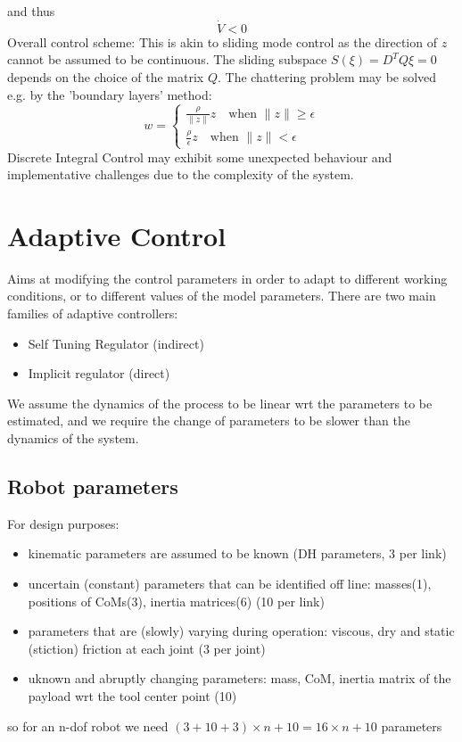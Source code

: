 \documentclass{book}
\begin{document}
and thus
\[
    \dot{V}<0
\]
Overall control scheme:
This is akin to sliding mode control as the direction of $z$ cannot be assumed to be continuous. The sliding subspace $S(\xi)=D^TQ\xi=0$ depends on the choice of the matrix $Q$. The chattering problem may be solved e.g. by the 'boundary layers' method:
\[
    w=\begin{cases}
        \displaystyle\frac{\rho}{\|z\|}z \quad \text{when }\|z\|\geq\epsilon\\
        \displaystyle\frac{\rho}{\epsilon}z \quad \text{when }\|z\|<\epsilon
    \end{cases}
\]
Discrete Integral Control may exhibit some unexpected behaviour and implementative challenges due to the complexity of the system. 


\section{Adaptive Control}
Aims at modifying the control parameters in order to adapt to different working conditions, or to different values of the model parameters.
There are two main families of adaptive controllers:
\begin{itemize}
    \item Self Tuning Regulator (indirect)
    \item Implicit regulator (direct)
\end{itemize}
We assume the dynamics of the process to be linear wrt the parameters to be estimated, and we require the change of parameters to be slower than the dynamics of the system. 
\subsection{Robot parameters}
For design purposes:
\begin{itemize}
    \item kinematic parameters are assumed to be known (DH parameters, 3 per link)
    \item uncertain (constant) parameters that can be identified off line: masses(1), positions of CoMs(3), inertia matrices(6) (10 per link)
    \item parameters that are (slowly) varying during operation: viscous, dry and static (stiction) friction at each joint (3 per joint)
    \item uknown and abruptly changing parameters: mass, CoM, inertia matrix of the payload wrt the tool center point (10)
\end{itemize}
so for an n-dof robot we need $(3+10+3)\times n +10=16\times n +10 $ parameters
\end{document}
